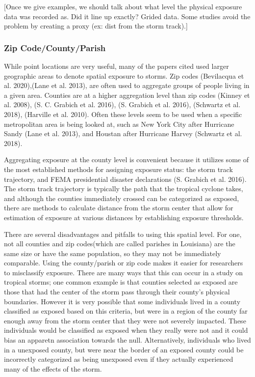 \documentclass[]{article}
\begin{document}
{[}Once we give examples, we should talk about what level the physical
exposure data was recorded as. Did it line up exactly? Grided data. Some
studies avoid the problem by creating a proxy (ex: dist from the storm
track).{]}

\subsubsection{Zip Code/County/Parish}\label{zip-codecountyparish}

While point locations are very useful, many of the papers cited used
larger geographic areas to denote spatial exposure to storms. Zip codes
(Bevilacqua et al. 2020),(Lane et al. 2013), are often used to aggregate
groups of people living in a given area. Counties are at a higher
aggregation level than zip codes (Kinney et al. 2008), (S. C. Grabich et
al. 2016), (S. Grabich et al. 2016), (Schwartz et al. 2018), (Harville
et al. 2010). Often these levels seem to be used when a specific
metropolitan area is being looked at, such as New York City after
Hurricane Sandy (Lane et al. 2013), and Houstan after Hurricane Harvey
(Schwartz et al. 2018).

Aggregating exposure at the county level is convenient because it
utilizes some of the most established methods for assigning exposure
status: the storm track trajectory, and FEMA presidential disaster
declarations (S. Grabich et al. 2016). The storm track trajectory is
typically the path that the tropical cyclone takes, and although the
counties immediately crossed can be categorized as exposed, there are
methods to calculate distance from the storm center that allow for
estimation of exposure at various distances by establishing exposure
thresholds.

There are several disadvantages and pitfalls to using this spatial
level. For one, not all counties and zip codes(which are called parishes
in Louisiana) are the same size or have the same population, so they may
not be immediately comparable. Using the county/parish or zip code makes
it easier for researchers to misclassify exposure. There are many ways
that this can occur in a study on tropical storms; one common example is
that counties selected as exposed are those that had the center of the
storm pass through their county's physical boundaries. However it is
very possible that some individuals lived in a county classified as
exposed based on this criteria, but were in a region of the county far
enough away from the storm center that they were not severely impacted.
These individuals would be classified as exposed when they really were
not and it could bias an apparetn association towards the null.
Alternatively, individuals who lived in a unexposed county, but were
near the border of an exposed county could be incorrectly categorized as
being unexposed even if they actually experienced many of the effects of
the storm.
\end{document}
